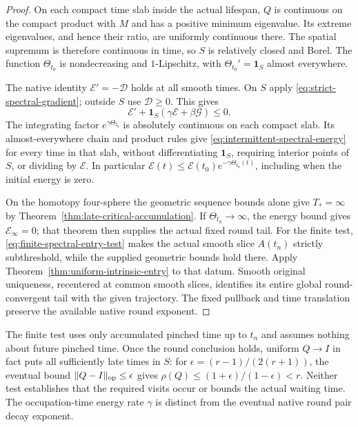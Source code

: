 \documentclass[11pt]{article}
\numberwithin{equation}{section}
\theoremstyle{definition}
\theoremstyle{remark}
\begin{document}
\begin{proof}
On each compact time slab inside the actual lifespan,
$Q$ is continuous on the compact product with $M$ and has
a positive minimum eigenvalue. Its extreme eigenvalues,
and hence their ratio, are uniformly continuous there.
The spatial supremum is therefore continuous in time,
so $S$ is relatively closed and Borel. The function
$\Theta_{t_0}$ is nondecreasing and $1$-Lipschitz, with
$\Theta_{t_0}'=\mathbf1_S$ almost everywhere.

The native identity $\mathscr E'=-\mathscr D$ holds at all
smooth times. On $S$ apply
\eqref{eq:strict-spectral-gradient}; outside $S$ use
$\mathscr D\ge0$. This gives
\[
 \mathscr E'+\mathbf1_S(\gamma\mathscr E+\beta\mathscr G)\le0.
\]
The integrating factor $e^{\gamma\Theta_{t_0}}$ is absolutely
continuous on each compact slab. Its almost-everywhere
chain and product rules give
\eqref{eq:intermittent-spectral-energy} for every time in
that slab, without differentiating $\mathbf1_S$, requiring
interior points of $S$, or dividing by $\mathscr E$.
In particular $\mathscr E(t)\le\mathscr E(t_0)
 e^{-\gamma\Theta_{t_0}(t)}$, including when the initial
energy is zero.

On the homotopy four-sphere the geometric sequence bounds
alone give $T_*=\infty$ by
Theorem~\ref{thm:late-critical-accumulation}.
If $\Theta_{t_0}\to\infty$, the energy bound gives
$\mathscr E_\infty=0$; that theorem then supplies the
actual fixed round tail. For the finite test,
\eqref{eq:finite-spectral-entry-test} makes the actual smooth
slice $A(t_n)$ strictly subthreshold, while the supplied
geometric bounds hold there. Apply
Theorem~\ref{thm:uniform-intrinsic-entry} to that datum.
Smooth original uniqueness, recentered at common smooth
slices, identifies its entire global round-convergent tail
with the given trajectory. The fixed pullback and time
translation preserve the available native round exponent.
\end{proof}

The finite test uses only accumulated pinched time up to
$t_n$ and assumes nothing about future pinched time.
Once the round conclusion holds, uniform $Q\to I$ in fact
puts all sufficiently late times in $S$: for
$\epsilon=(r-1)/(2(r+1))$, the eventual bound
$\|Q-I\|_{\rm op}\le\epsilon$ gives
$\rho(Q)\le(1+\epsilon)/(1-\epsilon)<r$.
Neither test establishes that the required visits occur or
bounds the actual waiting time. The occupation-time energy
rate $\gamma$ is distinct from the eventual native round
pair decay exponent.
\end{document}
